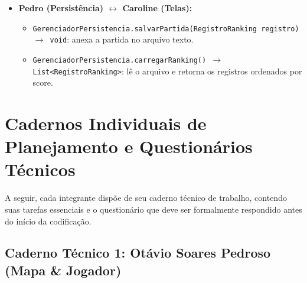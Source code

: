 \documentclass[11pt,a4paper]{article}
\begin{document}
\begin{itemize}[leftmargin=*]
  \item \textbf{Pedro (Persistência) $\leftrightarrow$ Caroline (Telas):}
  \begin{itemize}
    \item \texttt{GerenciadorPersistencia.salvarPartida(RegistroRanking registro) $\rightarrow$ void}: anexa a partida no arquivo texto.
    \item \texttt{GerenciadorPersistencia.carregarRanking() $\rightarrow$ List<RegistroRanking>}: lê o arquivo e retorna os registros ordenados por score.
  \end{itemize}
\end{itemize}

\newpage
\section{Cadernos Individuais de Planejamento e Questionários Técnicos}

A seguir, cada integrante dispõe de seu caderno técnico de trabalho, contendo suas tarefas essenciais e o questionário que deve ser formalmente respondido antes do início da codificação.

\subsection{Caderno Técnico 1: Otávio Soares Pedroso (Mapa \& Jogador)}
\end{document}
